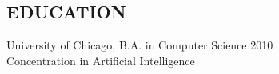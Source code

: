 \documentclass{res}
\begin{document}
 


\address{   6210 Belcrest Road \#1217 \\ 
            Hyattsville, MD 20782 \\ 
            jai@jaibot.com \\ 
            (609) 948-4264 \\ 
            http://jaibot.com \\ 
            http://github.com/jaibot }

\address{}
                                  
\begin{resume}

\section{EDUCATION}          
    University of Chicago, B.A. in Computer Science 2010  \\   
    Concentration in Artificial Intelligence      
 

\end{resume}
\end{document}
